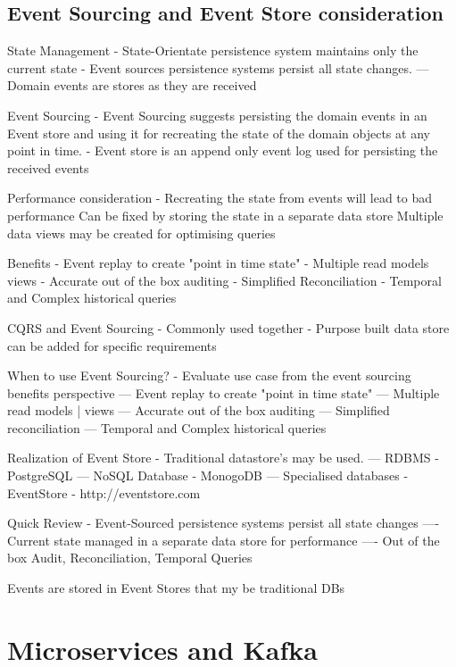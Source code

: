 
\section{Event Sourcing and Event Store consideration}

State Management
- State-Orientate persistence system maintains only the current state
- Event sources persistence systems persist all state changes.
--- Domain events are stores as they are received

Event Sourcing
- Event Sourcing suggests persisting the domain events in an Event store and using it for recreating the state of the domain objects at any point in time.
- Event store is an append only event log used for persisting the received events

Performance consideration - Recreating the state from events will lead to bad performance
Can be fixed by storing the state in a separate data store
Multiple data views may be created for optimising queries

Benefits
- Event replay to create "point in time state"
- Multiple read models views
- Accurate out of the box auditing
- Simplified Reconciliation
- Temporal and Complex historical queries

CQRS and Event Sourcing
- Commonly used together
- Purpose built data store can be added for specific requirements

When to use Event Sourcing?
- Evaluate use case from the event sourcing benefits perspective
--- Event replay to create "point in time state"
--- Multiple read models | views
--- Accurate out of the box auditing
--- Simplified reconciliation
--- Temporal and Complex historical queries

Realization of Event Store
- Traditional datastore's may be used.
--- RDBMS - PostgreSQL
--- NoSQL Database - MonogoDB
--- Specialised databases - EventStore - http://eventstore.com

Quick Review
- Event-Sourced persistence systems persist all state changes
---- Current state managed in a separate data store for performance
---- Out of the box Audit, Reconciliation, Temporal Queries

Events are stored in Event Stores that my be traditional DBs

\chapter{Microservices and Kafka}
